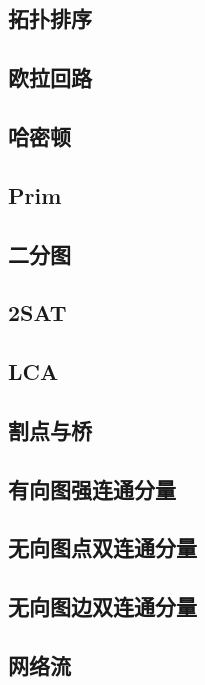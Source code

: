 \documentclass{article}
\begin{document}
\subsection{拓扑排序}

\subsection{欧拉回路}

\subsection{哈密顿}

\subsection{Prim}

\subsection{二分图}

\subsection{2SAT}

\subsection{LCA}

\subsection{割点与桥}

\subsection{有向图强连通分量}

\subsection{无向图点双连通分量}

\subsection{无向图边双连通分量}

\subsection{网络流}

\end{document}
